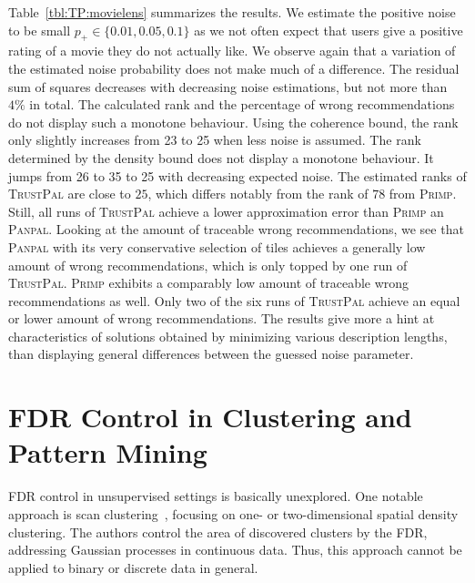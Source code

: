 Table~\ref{tbl:TP:movielens} summarizes the results. We estimate the positive noise to be small $p_+\in\{0.01,0.05,0.1\}$ as we not often expect that users give a positive rating of a movie they do not actually like. We observe again that a variation of the estimated noise probability does not make much of a difference. The residual sum of squares decreases with decreasing noise estimations, but not more than $4\%$ in total. The calculated rank and the percentage of wrong recommendations do not display such a monotone behaviour. Using the coherence bound, the rank only slightly increases from 23 to 25 when less noise is assumed. The rank determined by the density bound does not display a monotone behaviour. It jumps from 26 to 35 to 25 with decreasing expected noise. The estimated ranks of \textsc{TrustPal} are close to $25$, which differs notably from the rank of $78$ from \textsc{Primp}. Still, all runs of \textsc{TrustPal} achieve a lower approximation error than \textsc{Primp} an \textsc{Panpal}. Looking at the amount of traceable wrong recommendations, we see that \textsc{Panpal} with its very conservative selection of tiles achieves a generally low amount of wrong recommendations, which is only topped by one run of \textsc{TrustPal}. \textsc{Primp} exhibits a comparably low amount of traceable wrong recommendations as well. Only two of the six runs of \textsc{TrustPal} achieve an equal or lower amount of wrong recommendations. The results give more a hint at characteristics of solutions obtained by minimizing various description lengths, than displaying general differences between the guessed noise parameter. %
\section{FDR Control in Clustering and Pattern Mining}\label{sec:TP:relatedWork}
FDR control in unsupervised settings is basically unexplored. One notable approach is scan clustering~\citep{pacifico2007scan}, focusing on one- or two-dimensional spatial density clustering. The authors control the area of discovered clusters by the FDR, addressing Gaussian processes in continuous data. Thus, this approach cannot be applied to binary or discrete data in general.  

